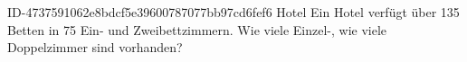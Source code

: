 \begin{exercise}
      {ID-4737591062e8bdcf5e39600787077bb97cd6fef6}
      {Hotel}
  \ifproblem\problem
    Ein Hotel verfügt über 135 Betten in 75 Ein- und Zweibettzimmern. Wie viele
    Einzel-, wie viele Doppelzimmer sind vorhanden?
  \fi
\end{exercise}
